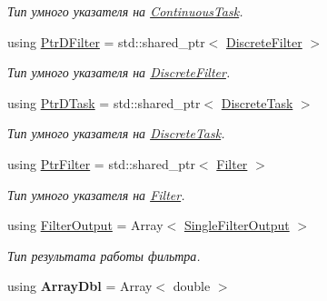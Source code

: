 \begin{DoxyCompactItemize}
\begin{DoxyCompactList}\small\item\em Тип умного указателя на \hyperlink{class_core_1_1_continuous_task}{Continuous\+Task}. \end{DoxyCompactList}\item 
using \hyperlink{namespace_core_a5bc2ef0a7d6facf16009f89297174aa6}{Ptr\+D\+Filter} = std\+::shared\+\_\+ptr$<$ \hyperlink{class_core_1_1_discrete_filter}{Discrete\+Filter} $>$\hypertarget{namespace_core_a5bc2ef0a7d6facf16009f89297174aa6}{}\label{namespace_core_a5bc2ef0a7d6facf16009f89297174aa6}

\begin{DoxyCompactList}\small\item\em Тип умного указателя на \hyperlink{class_core_1_1_discrete_filter}{Discrete\+Filter}. \end{DoxyCompactList}\item 
using \hyperlink{namespace_core_a9cd3f9b81303651b8d115031018f0ebf}{Ptr\+D\+Task} = std\+::shared\+\_\+ptr$<$ \hyperlink{class_core_1_1_discrete_task}{Discrete\+Task} $>$\hypertarget{namespace_core_a9cd3f9b81303651b8d115031018f0ebf}{}\label{namespace_core_a9cd3f9b81303651b8d115031018f0ebf}

\begin{DoxyCompactList}\small\item\em Тип умного указателя на \hyperlink{class_core_1_1_discrete_task}{Discrete\+Task}. \end{DoxyCompactList}\item 
using \hyperlink{namespace_core_afba80c2cb714c7d5793d9bcb9591e156}{Ptr\+Filter} = std\+::shared\+\_\+ptr$<$ \hyperlink{class_core_1_1_filter}{Filter} $>$\hypertarget{namespace_core_afba80c2cb714c7d5793d9bcb9591e156}{}\label{namespace_core_afba80c2cb714c7d5793d9bcb9591e156}

\begin{DoxyCompactList}\small\item\em Тип умного указателя на \hyperlink{class_core_1_1_filter}{Filter}. \end{DoxyCompactList}\item 
using \hyperlink{namespace_core_a60877581a235fc9566087b54d463ce9c}{Filter\+Output} = Array$<$ \hyperlink{struct_core_1_1_single_filter_output}{Single\+Filter\+Output} $>$\hypertarget{namespace_core_a60877581a235fc9566087b54d463ce9c}{}\label{namespace_core_a60877581a235fc9566087b54d463ce9c}

\begin{DoxyCompactList}\small\item\em Тип результата работы фильтра. \end{DoxyCompactList}\item 
using {\bfseries Array\+Dbl} = Array$<$ double $>$\hypertarget{namespace_core_afad0f3873edb3dbb0f2f845357db225d}{}\label{namespace_core_afad0f3873edb3dbb0f2f845357db225d}


\end{DoxyCompactItemize}
